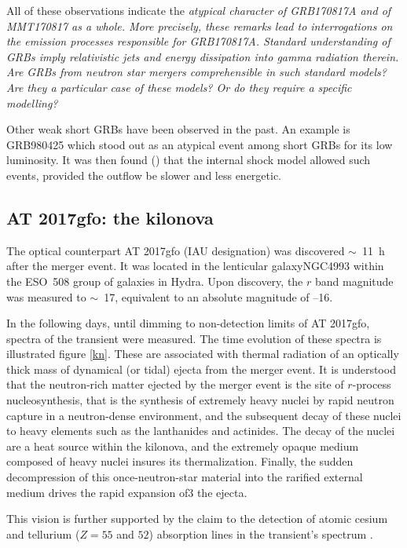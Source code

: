 All of these observations indicate the \it{atypical} character of GRB170817A and of MMT170817 as a whole. More precisely, these remarks lead to interrogations on the emission processes responsible for GRB170817A. Standard understanding of GRBs imply relativistic jets and energy dissipation into gamma radiation therein. Are GRBs from neutron star mergers comprehensible in such standard models? Are they a particular case of these models? Or do they require a specific modelling?

Other weak short GRBs have been observed in the past. An example is GRB980425 which stood out as an atypical event among short GRBs for its low luminosity. It was then found (\cite{50}) that the internal shock model allowed such events, provided the outflow be slower and less energetic.


\subsection{AT 2017gfo: the kilonova}
\label{kilonova}
The optical counterpart AT 2017gfo (IAU designation) was discovered $\sim$~11~h after the merger event. It was located in the lenticular galaxyNGC4993 within the ESO~508 group of galaxies in Hydra. Upon discovery, the $r$ band magnitude was measured to $\sim$~17, equivalent to an absolute magnitude of --16.

In the following days, until dimming to non-detection limits of AT 2017gfo, spectra of the transient were measured. The time evolution of these spectra is illustrated figure \ref{kn}. These are associated with thermal radiation of an optically thick mass of dynamical (or tidal) ejecta from the merger event. It is understood that the neutron-rich matter ejected by the merger event is the site of $r$-process nucleosynthesis, that is the synthesis of extremely heavy nuclei by rapid neutron capture in a neutron-dense environment, and the subsequent decay of these nuclei to heavy elements such as the lanthanides and actinides. The decay of the nuclei are a heat source within the kilonova, and the extremely opaque medium composed of heavy nuclei insures its thermalization. Finally, the sudden decompression of this once-neutron-star material into the rarified external medium drives the rapid expansion of3 the ejecta.

This vision is further supported by the claim to the detection of atomic cesium and tellurium ($Z = 55$ and $52$) absorption lines in the transient's spectrum \cite{53}.


